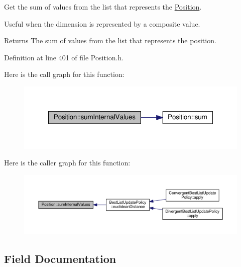 Get the sum of values from the list that represents the \hyperlink{structPosition}{Position}. 

Useful when the dimension is represented by a composite value.

\begin{DoxyReturn}{Returns}
The sum of values from the list that represents the position. 
\end{DoxyReturn}


Definition at line 401 of file Position.\+h.



Here is the call graph for this function\+:
\nopagebreak
\begin{figure}[H]
\begin{center}
\leavevmode
\includegraphics[width=347pt]{structPosition_a8f9b5812209642cb31de38d3745cfc16_cgraph}
\end{center}
\end{figure}




Here is the caller graph for this function\+:
\nopagebreak
\begin{figure}[H]
\begin{center}
\leavevmode
\includegraphics[width=350pt]{structPosition_a8f9b5812209642cb31de38d3745cfc16_icgraph}
\end{center}
\end{figure}




\subsection{Field Documentation}
